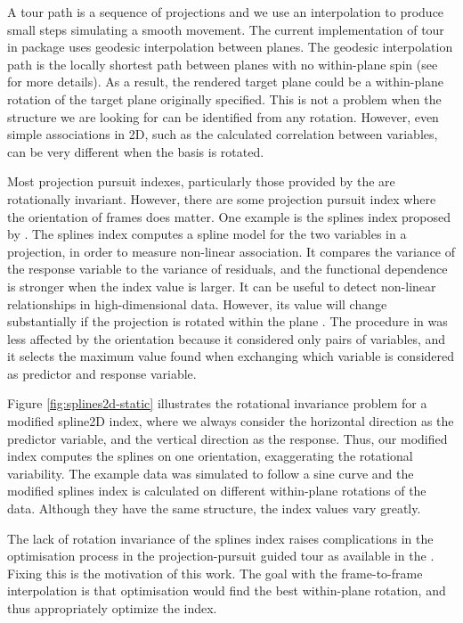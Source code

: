 A tour path is a sequence of projections and we use an interpolation to
produce small steps simulating a smooth movement. The current
implementation of tour in  package uses geodesic
interpolation between planes. The geodesic interpolation path is the
locally shortest path between planes with no within-plane spin (see
\citet{Buja2004TheoryOD} for more details). As a result, the rendered
target plane could be a within-plane rotation of the target plane
originally specified. This is not a problem when the structure we are
looking for can be identified from any rotation. However, even simple
associations in 2D, such as the calculated correlation between
variables, can be very different when the basis is rotated.

Most projection pursuit indexes, particularly those provided by the
 are rotationally invariant. However, there are some
projection pursuit index where the orientation of frames does matter.
One example is the splines index proposed by \citet{Grimm2016}. The
splines index computes a spline model for the two variables in a
projection, in order to measure non-linear association. It compares the
variance of the response variable to the variance of residuals, and the
functional dependence is stronger when the index value is larger. It can
be useful to detect non-linear relationships in high-dimensional data.
However, its value will change substantially if the projection is
rotated within the plane \citep{pp}. The procedure in \citet{Grimm2016}
was less affected by the orientation because it considered only pairs of
variables, and it selects the maximum value found when exchanging which
variable is considered as predictor and response variable.

Figure \ref{fig:splines2d-static} illustrates the rotational invariance
problem for a modified spline2D index, where we always consider the
horizontal direction as the predictor variable, and the vertical
direction as the response. Thus, our modified index computes the splines
on one orientation, exaggerating the rotational variability. The example
data was simulated to follow a sine curve and the modified splines index
is calculated on different within-plane rotations of the data. Although
they have the same structure, the index values vary greatly.

The lack of rotation invariance of the splines index raises
complications in the optimisation process in the projection-pursuit
guided tour as available in the . Fixing this is the
motivation of this work. The goal with the frame-to-frame interpolation
is that optimisation would find the best within-plane rotation, and thus
appropriately optimize the index.

